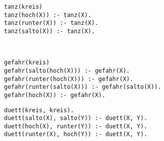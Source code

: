 \documentclass[a4paper,10pt]{article}
\begin{document}
	\begin{compactenum} [(a)]
		\item 
		\begin{verbatim}
		tanz(kreis)
		tanz(hoch(X)) :- tanz(X).
		tanz(runter(X)) :- tanz(X).
		tanz(salto(X)) :- tanz(X).
		\end{verbatim}\
		\item 
		\begin{verbatim}
		gefahr(kreis)
		gefahr(salto(hoch(X))) :- gefahr(X).
		gefahr(runter(hoch(X))) :- gefahr(X).
		gefahr(runter(salto(X))) :- gefahr(salto(X)).
		gefahr(hoch(X)) :- gefahr(X).
		\end{verbatim}
		\item 
		\begin{verbatim}
		duett(kreis, kreis).
		duett(salto(X), salto(Y)) :- duett(X, Y).
		duett(hoch(X), runter(Y)) :- duett(X, Y).
		duett(runter(X), hoch(Y)) :- duett(X, Y).
		\end{verbatim}
	\end{compactenum}
\end{document}
